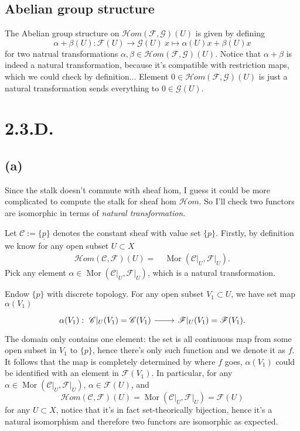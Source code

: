 \subsection{Abelian group structure}
	The Abelian group structure on $\mathcal Hom(\mathscr F,\mathscr G)(U)$ is given by defining 
	\[\alpha+\beta (U):\mathscr F(U)\to \mathscr G(U) ~ x\mapsto \alpha(U)x+\beta(U)x\] for two natrual transformations $\alpha,\beta\in \mathcal Hom(\mathscr F,\mathscr G)(U)$. Notice that $\alpha+\beta$ is indeed a natural transformation, because it's compatible with restriction maps, which we could check by definition... 
	Element $0\in \mathcal Hom(\mathscr F,\mathscr G)(U)$ is just a natural transformation sends everything to $0\in \mathscr G(U)$.


\section{2.3.D.}

\subsection{(a)}

Since the stalk doesn't commute with sheaf hom, I guess it could be more complicated to compute the stalk for sheaf hom $\mathcal Hom$. So I'll check two functors are isomorphic in terms of \textit{natural transformation}. 

Let $\mathscr C:=\underline{\{p\}}$ denotes the constant sheaf with value set $\{p\}$.
Firstly, by definition we know for any open subset $U\subset X$
\begin{align*}
	\mathcal Hom (\mathscr C,\mathscr F)(U) =&~ \operatorname{Mor}(\mathscr C\vert_U,\mathscr F\vert_U).
\end{align*}
Pick any element $\alpha\in\operatorname{Mor}(\mathscr C\vert_U,\mathscr F\vert_U)$, which is a natural transformation. 

Endow $\{p\}$ with discrete topology. 
For any open subset $V_1\subset U$, we have set map $\alpha(V_1)$
\[\begin{tikzcd}
	{\alpha(V_1):~\mathscr C\vert_U(V_1)=\mathscr C(V_1)} & {\mathscr F\vert_U(V_1)=\mathscr F(V_1)}
	\arrow[from=1-1, to=1-2].
\end{tikzcd}\]
The domain only contains one element: the set is all continuous map from some open subset in $V_1$ to $\{p\}$, hence there's only such function and we denote it as $f$. It follows that the map is completely determined by where $f$ goes, $\alpha(V_1)$ could be identified with an element in $\mathscr F(V_1)$. In particular, for any $\alpha\in\operatorname{Mor}(\mathscr C\vert_U,\mathscr F\vert_U)$, $\alpha\in \mathscr F(U)$, and 
\[\mathcal Hom (\mathscr C,\mathscr F)(U) = \operatorname{Mor}(\mathscr C\vert_U,\mathscr F\vert_U)= \mathscr F(U)\] for any $U\subset X$, notice that it's in fact set-theorically bijection, hence it's a natural isomorphism and therefore two functors are isomorphic as expected. 

